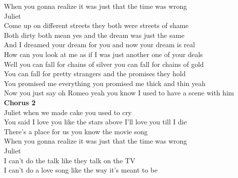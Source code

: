   When you gonna realize it was  just that the time was  wrong \\
  Juliet          \\
 Come up on different streets  they both were streets of shame  \\
   Both dirty both  mean  yes and the dream was  just the same  \\
 And I dreamed your dream for you   and now your dream is  real \\
 How can you look at me as if I was  just another one of your deals \\
 Well you can  fall for chains of silver   you can fall for chains of gold   \\
   You can fall for pretty strangers   and the promises they hold  \\
 You promised me everything   you promised me  thick and thin yeah  \\
 Now you just say oh Romeo yeah you know I  used to have a scene with him \\
 \textbf{Chorus 2}\\
 Juliet  when we made  cake you used to  cry\\
 You said I  love you like the  stars above I'll  love you till I  die \\
 There's a  place  for  us  you know the  movie song \\
 When you gonna realize it was  just that the time was  wrong \\
 Juliet          \\
 I can't do the talk  like they talk on the TV    \\
 I can't do a love song   like the way it's  meant to be  \\
